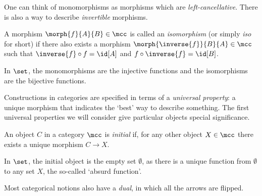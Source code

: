 One can think of monomorphisms as morphisms which are \emph{left-cancellative}.
There is also a way to describe \emph{invertible} morphisms.

\begin{definition}[Isomorphism]
    A morphism \(\morph{f}{A}{B} \in \mcc\) is called an \emph{isomorphism} (or
    simply \emph{iso} for short) if there also exists a morphism \(
    \morph{\inverse{f}}{B}{A} \in \mcc
    \) such that \(
    \inverse{f} \circ f = \id[A]
    \) and \(
    f \circ \inverse{f} = \id[B]
    \).
    \begin{center}
    \end{center}
\end{definition}

\begin{example}
    In \(\set\), the monomorphisms are the injective functions and the
    isomorphisms are the bijective functions.
\end{example}

Constructions in categories are specified in terms of a
\emph{universal property}: a unique morphism that indicates the `best' way to
describe something.
The first universal properties we will consider give particular objects special
significance.

\begin{definition}
    An object \(C\) in a category \(\mcc\) is \emph{initial} if, for any other
    object \(X \in \mcc\) there exists a unique morphism \(C \to X\).
\end{definition}

\begin{example}
    In \(\set\), the initial object is the empty set \(\emptyset\), as there is
    a unique function from \(\emptyset\) to any set \(X\), the so-called
    `absurd function'.
\end{example}

Most categorical notions also have a \emph{dual}, in which all the
arrows are flipped.

